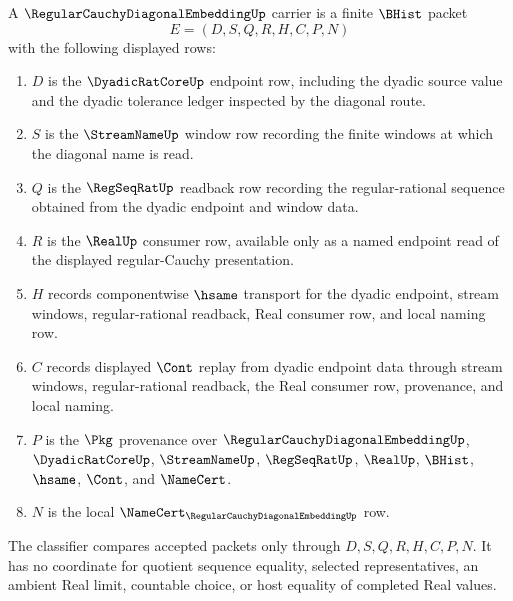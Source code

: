 \begin{definition}
\label{def:regular-cauchy-diagonal-embedding-carrier}
A $\RegularCauchyDiagonalEmbeddingUp$ carrier is a finite $\BHist$ packet
$$
E=(D,S,Q,R,H,C,P,N)
$$
with the following displayed rows:
\begin{enumerate}
\item $D$ is the $\DyadicRatCoreUp$ endpoint row, including the dyadic source value and the dyadic tolerance ledger inspected by the diagonal route.
\item $S$ is the $\StreamNameUp$ window row recording the finite windows at which the diagonal name is read.
\item $Q$ is the $\RegSeqRatUp$ readback row recording the regular-rational sequence obtained from the dyadic endpoint and window data.
\item $R$ is the $\RealUp$ consumer row, available only as a named endpoint read of the displayed regular-Cauchy presentation.
\item $H$ records componentwise $\hsame$ transport for the dyadic endpoint, stream windows, regular-rational readback, Real consumer row, and local naming row.
\item $C$ records displayed $\Cont$ replay from dyadic endpoint data through stream windows, regular-rational readback, the Real consumer row, provenance, and local naming.
\item $P$ is the $\Pkg$ provenance over $\RegularCauchyDiagonalEmbeddingUp$, $\DyadicRatCoreUp$, $\StreamNameUp$, $\RegSeqRatUp$, $\RealUp$, $\BHist$, $\hsame$, $\Cont$, and $\NameCert$.
\item $N$ is the local $\NameCert_{\RegularCauchyDiagonalEmbeddingUp}$ row.
\end{enumerate}
The classifier compares accepted packets only through $D,S,Q,R,H,C,P,N$. It has no coordinate for quotient sequence equality, selected representatives, an ambient Real limit, countable choice, or host equality of completed Real values.
\end{definition}

